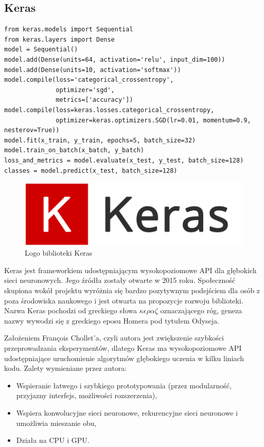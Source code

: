 \documentclass[12pt,a4paper,twoside,titlepage,openright]{book}
\begin{document}
\subsection{Keras}


\noindent
\begin{minipage}{\linewidth}
\begin{lstlisting}[caption=Skrypt najprostszego modelu sekwencyjnego (Keras w 30 sekund), label=lst:test]
from keras.models import Sequential
from keras.layers import Dense
model = Sequential()
model.add(Dense(units=64, activation='relu', input_dim=100))
model.add(Dense(units=10, activation='softmax'))
model.compile(loss='categorical_crossentropy',
              optimizer='sgd',
              metrics=['accuracy'])
model.compile(loss=keras.losses.categorical_crossentropy,
              optimizer=keras.optimizers.SGD(lr=0.01, momentum=0.9, nesterov=True))
model.fit(x_train, y_train, epochs=5, batch_size=32)
model.train_on_batch(x_batch, y_batch)
loss_and_metrics = model.evaluate(x_test, y_test, batch_size=128)
classes = model.predict(x_test, batch_size=128)
\end{lstlisting}
\end{minipage}

\begin{figure}[ht]
	\centering
			\includegraphics[resolution=100, scale=0.3]{Keras.png}
		\caption{Logo biblioteki Keras}
\end{figure}

Keras jest frameworkiem udostępniającym wysokopoziomowe API dla głębokich sieci neuronowych. Jego źródła zostały otwarte w 2015 roku. Społeczność skupiona wokół projektu wyróżnia się bardzo pozytywnym podejściem dla osób z poza środowiska naukowego i jest otwarta na propozycje rozwoju biblioteki. Nazwa Keras pochodzi od greckiego słowa \(\kappa\epsilon\rho\alpha\zeta\) oznaczającego róg, geneza nazwy wywodzi się z greckiego eposu Homera pod tytułem Odyseja.

Założeniem François Chollet'a, czyli autora jest zwiększenie szybkości przeprowadzania eksperymentów, dlatego Keras ma wysokopoziomowe API udostępniające uruchomienie algorytmów głębokiego uczenia w kilku liniach kodu. Zalety wymieniane przez autora:
\begin{itemize}
\item Wspieranie łatwego i szybkiego prototypowania (przez modularność, przyjazny interfejs, możliwości rozszerzenia),
\item Wspiera konwolucyjne sieci neuronowe, rekurencyjne sieci neuronowe i umożliwia mieszanie obu,
\item Działa na CPU i GPU.
\end{itemize}
\end{document}
